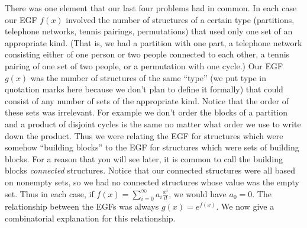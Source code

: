 \documentclass[10pt,]{book}
\theoremstyle{plain}
\theoremstyle{definition}
\numberwithin{equation}{chapter}
\begin{document}
There was one element that our last four problems had in common. In each case our EGF \(f(x)\) involved the number of structures of a certain type (partitions, telephone networks, tennis pairings, permutations) that used only one set of an appropriate kind. (That is, we had a partition with one part, a telephone network consisting either of one person or two people connected to each other, a tennis pairing of one set of two people, or a permutation with one cycle.) Our EGF \(g(x)\) was the number of structures of the same ``type'' (we put type in quotation marks here because we don't plan to define it formally) that could consist of any number of sets of the appropriate kind. Notice that the order of these sets was irrelevant. For example we don't order the blocks of a partition and a product of disjoint cycles is the same no matter what order we use to write down the product. Thus we were relating the EGF for structures which were somehow ``building blocks'' to the EGF for structures which were sets of building blocks. For a reason that you will see later, it is common to call the building blocks \emph{connected} structures. Notice that our connected structures were all based on nonempty sets, so we had no connected structures whose value was the empty set. Thus in each case, if \(f(x) = \sum_{i=0}^\infty a_i\frac{x^i}{i!}\), we would have \(a_0=0\). The relationship between the EGFs was always \(g(x) = e^{f(x)}\). We now give a combinatorial explanation for this relationship.%
\end{document}
